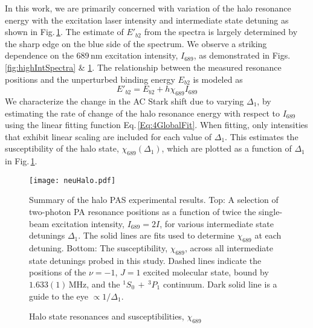 In this work, we are primarily concerned with variation of the halo resonance energy with the excitation laser intensity and intermediate state detuning as shown in Fig.\,\ref{fig:neuHalo}.
The estimate of $E'_{b2}$ from the spectra is largely determined by the sharp edge on the blue side of the spectrum.
We observe a striking dependence on the 689\,nm excitation intensity, $I_{689}$, as demonstrated in Figs.\,\ref{fig:highIntSpectra} \& \ref{fig:neuHalo}.
The relationship between the measured resonance positions and the unperturbed binding energy $E_{b2}$ is modeled as
\begin{equation}\label{Eq:4GlobalFit}
	E'_{b2} = E_{b2} + h\chi_{689}I_{689}
\end{equation}
We characterize the change in the AC Stark shift due to varying $\Delta_1$, by estimating the rate of change of the halo resonance energy with respect to $I_{689}$ using the linear fitting function Eq.\,\ref{Eq:4GlobalFit}.
When fitting, only intensities that exhibit linear scaling are included for each value of $\Delta_1$.
This estimates the susceptibility of the halo state, $\chi_{689}(\Delta_1)$, which are plotted as a function of $\Delta_1$ in Fig.\,\ref{fig:neuHalo}.
	\begin{figure}
	\centerline{
	  \texttt{[image: neuHalo.pdf]}}
	  \caption{Halo state resonances and susceptibilities, $\chi_{689}$}{Summary of the halo PAS experimental results. Top: A selection of two-photon PA resonance positions as a function of twice the single-beam excitation intensity, $I_{689} = 2I$, for various intermediate state detunings $\Delta_1$. The solid lines are fits used to determine $\chi_{689}$ at each detuning. Bottom: The susceptibility, $\chi_{689}$, across all intermediate state detunings probed in this study. Dashed lines indicate the positions of the $\nu=-1$, $J=1$ excited molecular state, bound by $1.633(1)$\,MHz, and the $^1S_0\,+\,^3P_1$ continuum. Dark solid line is a guide to the eye $\propto 1/\Delta_1$.}
	   \label{fig:neuHalo}
	\end{figure}
	
%	
	
